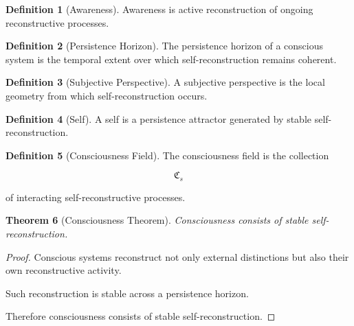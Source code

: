 \documentclass[12pt,oneside]{article}
\newtheorem{theorem}{Theorem}[section] \newtheorem{lemma}[theorem]{Lemma} \newtheorem{proposition}[theorem]{Proposition} \newtheorem{corollary}[theorem]{Corollary}
\theoremstyle{definition}
\newtheorem{definition}[theorem]{Definition} \newtheorem{axiom}[theorem]{Axiom} \newtheorem{remark}[theorem]{Remark} \newtheorem{example}[theorem]{Example}
\begin{document}
\begin{definition}[Awareness]

Awareness is active reconstruction of ongoing reconstructive processes.

\end{definition}

\begin{definition}[Persistence Horizon]

The persistence horizon of a conscious system is the temporal extent over which self-reconstruction remains coherent.

\end{definition}

\begin{definition}[Subjective Perspective]

A subjective perspective is the local geometry from which self-reconstruction occurs.

\end{definition}

\begin{definition}[Self]

A self is a persistence attractor generated by stable self-reconstruction.

\end{definition}

\begin{definition}[Consciousness Field]

The consciousness field is the collection

\[
\mathfrak C_s
\]

of interacting self-reconstructive processes.

\end{definition}

\begin{theorem}[Consciousness Theorem]

Consciousness consists of stable self-reconstruction.

\end{theorem}

\begin{proof}

Conscious systems reconstruct not only external distinctions but also their own reconstructive activity.

Such reconstruction is stable across a persistence horizon.

Therefore consciousness consists of stable self-reconstruction.

\end{proof}
\end{document}
